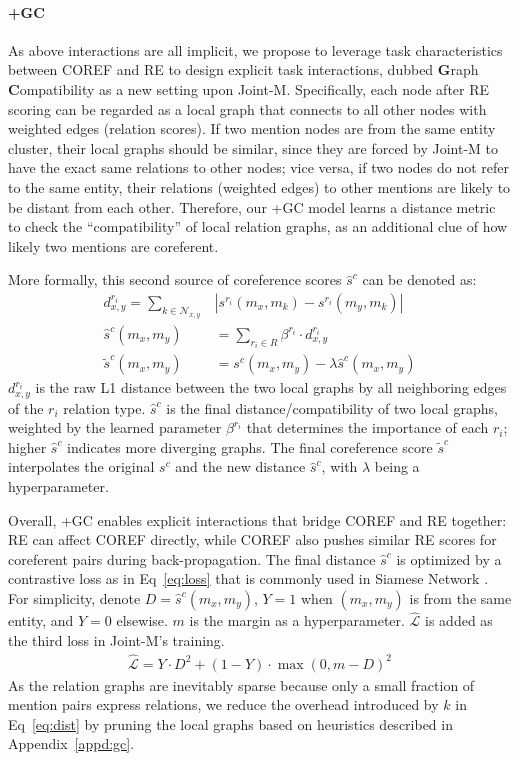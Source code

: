\documentclass[11pt]{article}
\begin{document}
\paragraph{+GC}
As above interactions are all implicit, we propose to leverage task characteristics between COREF and RE to design explicit task interactions, dubbed \textbf{G}raph \textbf{C}ompatibility as a new setting upon Joint-M. Specifically, each node after RE scoring can be regarded as a local graph that connects to all other nodes with weighted edges (relation scores). If two mention nodes are from the same entity cluster, their local graphs should be similar, since they are forced by Joint-M to have the exact same relations to other nodes; vice versa, if two nodes do not refer to the same entity, their relations (weighted edges) to other mentions are likely to be distant from each other. Therefore, our +GC model learns a distance metric to check the ``compatibility'' of local relation graphs, as an additional clue of how likely two mentions are coreferent.

More formally, this second source of coreference scores $\hat{s}^c$ can be denoted as:
\begin{align}
    d^{r_i}_{x,y} = \sum_{k \in \mathcal{N}_{x,y}} & |s^{r_i}(m_x, m_k) - s^{r_i}(m_y, m_k)| \label{eq:dist} \\
    \hat{s}^c (m_x, m_y) &= \sum_{r_i \in R} \beta^{r_i} \cdot d^{r_i}_{x,y} \label{eq:final_dist} \\
    \widetilde{s}^c (m_x, m_y) &= s^c (m_x, m_y) - \lambda \hat{s}^c (m_x, m_y) \nonumber
\end{align}
$d^{r_i}_{x,y}$ is the raw L1 distance between the two local graphs by all neighboring edges of the $r_i$ relation type.
$\hat{s}^c$ is the final distance/compatibility of two local graphs, weighted by the learned parameter $\beta^{r_i}$ that determines the importance of each $r_i$; higher $\hat{s}^c$ indicates more diverging graphs.
The final coreference score $\widetilde{s}^c$ interpolates the original $s^c$ and the new distance $\hat{s}^c$, with $\lambda$ being a hyperparameter.

Overall, +GC enables explicit interactions that bridge COREF and RE together: RE can affect COREF directly, while COREF also pushes similar RE scores for coreferent pairs during back-propagation. The final distance $\hat{s}^c$ is optimized by a contrastive loss as in Eq~\eqref{eq:loss} that is commonly used in Siamese Network \citep{siamese}. For simplicity, denote $D = \hat{s}^c (m_x, m_y)$, $Y = 1$ when $(m_x, m_y)$ is from the same entity, and $Y = 0$ elsewise. $m$ is the margin as a hyperparameter. $\hat{\mathcal{L}}$ is added as the third loss in Joint-M's training.
\begin{align}
    \hat{\mathcal{L}} = Y \cdot D^2 + (1 - Y) \cdot \max (0, m - D)^2 \label{eq:loss}
\end{align}
As the relation graphs are inevitably sparse because only a small fraction of mention pairs express relations, we reduce the overhead introduced by $k$ in Eq~\eqref{eq:dist} by pruning the local graphs based on heuristics described in Appendix~\ref{appd:gc}.
\end{document}
